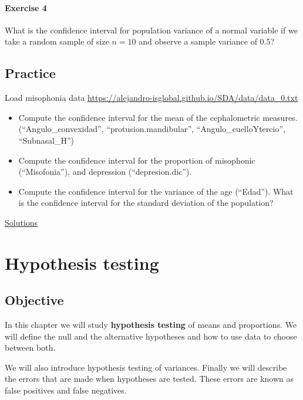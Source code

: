 \documentclass[
]{book}
\begin{document}
\hypertarget{exercise-4-4}{%
\subsubsection{Exercise 4}\label{exercise-4-4}}

What is the confidence interval for population variance of a normal variable if we take a random sample of size \(n=10\) and observe a sample variance of \(0.5\)?

\hypertarget{practice-3}{%
\section{Practice}\label{practice-3}}

Load misophonia data \url{https://alejandro-isglobal.github.io/SDA/data/data_0.txt}

\begin{itemize}
\item
  Compute the confidence interval for the mean of the cephalometric measures. (``Angulo\_convexidad'', ``protusion.mandibular'', ``Angulo\_cuelloYtercio'', ``Subnasal\_H'')
\item
  Compute the confidence interval for the proportion of misophonic (``Misofonia''), and depression (``depresion.dic'').
\item
  Compute the confidence interval for the variance of the age (``Edad''). What is the confidence interval for the standard deviation of the population?
\end{itemize}

\href{https://colab.research.google.com/drive/13El5aoycT_6Wasvyx427TvglygiSPMpF?usp=sharing}{Solutions}

\hypertarget{hypothesis-testing}{%
\chapter{Hypothesis testing}\label{hypothesis-testing}}

\hypertarget{objective-9}{%
\section{Objective}\label{objective-9}}

In this chapter we will study \textbf{hypothesis testing} of means and proportions. We will define the null and the alternative hypotheses and how to use data to choose between both.

We will also introduce hypothesis testing of variances. Finally we will describe the errors that are made when hypotheses are tested. These errors are known as false positives and false negatives.
\end{document}
